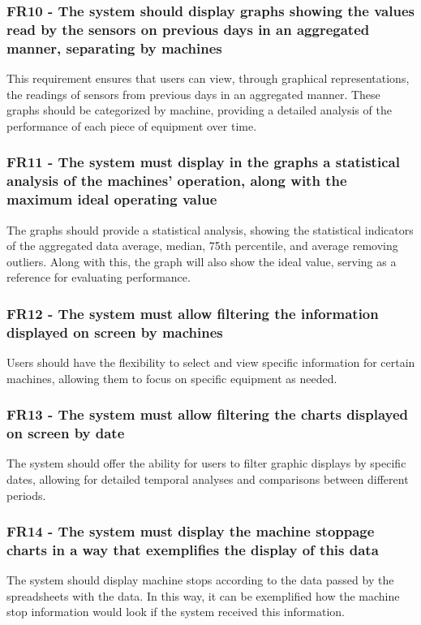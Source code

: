 \subsubsection{FR10 - The system should display graphs showing the values read by the sensors on previous days in an aggregated manner, separating by machines}This requirement ensures that users can view, through graphical representations, the readings of sensors from previous days in an aggregated manner. These graphs should be categorized by machine, providing a detailed analysis of the performance of each piece of equipment over time.

\subsubsection{FR11 - The system must display in the graphs a statistical analysis of the machines' operation, along with the maximum ideal operating value}
The graphs should provide a statistical analysis, showing the statistical indicators of the aggregated data average, median, 75th percentile, and average removing outliers. Along with this, the graph will also show the ideal value, serving as a reference for evaluating performance.

\subsubsection{FR12 - The system must allow filtering the information displayed on screen by machines}
Users should have the flexibility to select and view specific information for certain machines, allowing them to focus on specific equipment as needed.

\subsubsection{FR13 - The system must allow filtering the charts displayed on screen by date}
The system should offer the ability for users to filter graphic displays by specific dates, allowing for detailed temporal analyses and comparisons between different periods.

\subsubsection{FR14 - The system must display the machine stoppage charts in a way that exemplifies the display of this data}The system should display machine stops according to the data passed by the spreadsheets with the data. In this way, it can be exemplified how the machine stop information would look if the system received this information.

